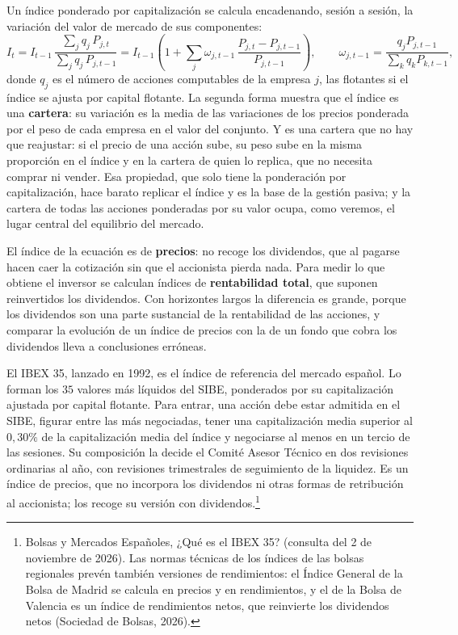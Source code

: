 \documentclass[10pt,a4paper]{article}
\begin{document}
Un índice ponderado por capitalización se calcula encadenando, sesión a sesión, la variación del valor de mercado de sus componentes:
$$I_t=I_{t-1}\,\frac{\sum_{j}q_{j}\,P_{j,t}}{\sum_{j}q_{j}\,P_{j,t-1}}=I_{t-1}\left(1+\sum_j\omega_{j,t-1}\,\frac{P_{j,t}-P_{j,t-1}}{P_{j,t-1}}\right),\qquad \omega_{j,t-1}=\frac{q_jP_{j,t-1}}{\sum_k q_kP_{k,t-1}},$$
donde $q_j$ es el número de acciones computables de la empresa $j$, las flotantes si el índice se ajusta por capital flotante. La segunda forma muestra que el índice es una \textbf{cartera}: su variación es la media de las variaciones de los precios ponderada por el peso de cada empresa en el valor del conjunto. Y es una cartera que no hay que reajustar: si el precio de una acción sube, su peso sube en la misma proporción en el índice y en la cartera de quien lo replica, que no necesita comprar ni vender. Esa propiedad, que solo tiene la ponderación por capitalización, hace barato replicar el índice y es la base de la gestión pasiva; y la cartera de todas las acciones ponderadas por su valor ocupa, como veremos, el lugar central del equilibrio del mercado.

El índice de la ecuación es de \textbf{precios}: no recoge los dividendos, que al pagarse hacen caer la cotización sin que el accionista pierda nada. Para medir lo que obtiene el inversor se calculan índices de \textbf{rentabilidad total}, que suponen reinvertidos los dividendos. Con horizontes largos la diferencia es grande, porque los dividendos son una parte sustancial de la rentabilidad de las acciones, y comparar la evolución de un índice de precios con la de un fondo que cobra los dividendos lleva a conclusiones erróneas.

El IBEX 35, lanzado en 1992, es el índice de referencia del mercado español. Lo forman los $35$ valores más líquidos del SIBE, ponderados por su capitalización ajustada por capital flotante. Para entrar, una acción debe estar admitida en el SIBE, figurar entre las más negociadas, tener una capitalización media superior al $0{,}30\%$ de la capitalización media del índice y negociarse al menos en un tercio de las sesiones. Su composición la decide el Comité Asesor Técnico en dos revisiones ordinarias al año, con revisiones trimestrales de seguimiento de la liquidez. Es un índice de precios, que no incorpora los dividendos ni otras formas de retribución al accionista; los recoge su versión con dividendos.\footnote{%
    Bolsas y Mercados Españoles, ¿Qué es el IBEX 35? (consulta del 2 de noviembre de 2026). Las normas técnicas de los índices de las bolsas regionales prevén también versiones de rendimientos: el Índice General de la Bolsa de Madrid se calcula en precios y en rendimientos, y el de la Bolsa de Valencia es un índice de rendimientos netos, que reinvierte los dividendos netos (Sociedad de Bolsas, 2026).
}
\end{document}
